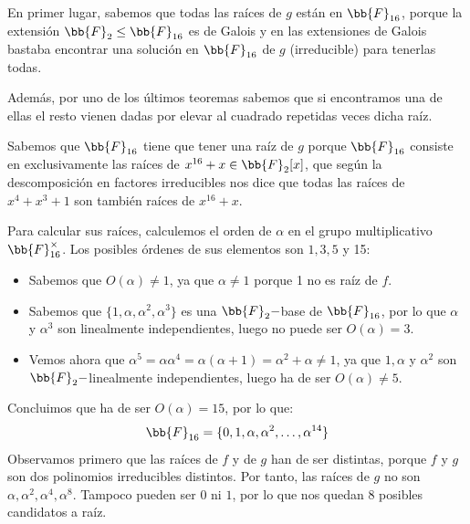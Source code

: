 \begin{ejemplo}
\begin{itemize}
            En primer lugar, sabemos que todas las raíces de $g$ están en $\bb{F}_{16}$, porque la extensión $\bb{F}_2\leq \bb{F}_{16}$ es de Galois y en las extensiones de Galois bastaba encontrar una solución en $\bb{F}_{16}$ de $g$ (irreducible) para tenerlas todas. 

            Además, por uno de los últimos teoremas sabemos que si encontramos una de ellas el resto vienen dadas por elevar al cuadrado repetidas veces dicha raíz.

            Sabemos que $\bb{F}_{16}$ tiene que tener una raíz de $g$ porque $\bb{F}_{16}$ consiste en exclusivamente las raíces de $x^{16}+x\in \bb{F}_2[x]$, que según la descomposición en factores irreducibles nos dice que todas las raíces de $x^4+x^3+1$ son también raíces de $x^{16}+x$.

            Para calcular sus raíces, calculemos el orden de $\alpha$ en el grupo multiplicativo $\bb{F}_{16}^\times$. Los posibles órdenes de sus elementos son $1,3,5$ y 15:
            \begin{itemize}
                \item Sabemos que $O(\alpha)\neq 1$, ya que $\alpha\neq 1$ porque 1 no es raíz de $f$.
                \item Sabemos que $\{1,\alpha,\alpha^2,\alpha^3\}$ es una $\bb{F}_2-$base de $\bb{F}_{16}$, por lo que $\alpha$ y $\alpha^3$ son linealmente independientes, luego no puede ser $O(\alpha) = 3$.
                \item Vemos ahora que $\alpha^5 = \alpha \alpha^4 = \alpha(\alpha+1) = \alpha^2 + \alpha \neq 1$, ya que $1,\alpha$ y $\alpha^2$ son $\bb{F}_2-$linealmente independientes, luego ha de ser $O(\alpha)\neq 5$.
            \end{itemize}
            Concluimos que ha de ser $O(\alpha) = 15$, por lo que:
            \begin{equation*}
                \bb{F}_{16} = \{0,1,\alpha, \alpha^2, \ldots, \alpha^{14}\}
            \end{equation*}
            Observamos primero que las raíces de $f$ y de $g$ han de ser distintas, porque $f$ y $g$ son dos polinomios irreducibles distintos. Por tanto, las raíces de $g$ no son $\alpha,\alpha^2,\alpha^4,\alpha^8$. Tampoco pueden ser $0$ ni $1$, por lo que nos quedan 8 posibles candidatos a raíz.


\end{itemize}
\end{ejemplo}
